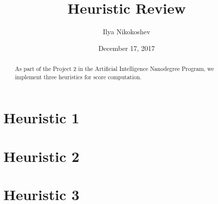 \documentclass[oneside]{article}   	%
\title{Heuristic Review}
\author{Ilya Nikokoshev}
\date{December 17, 2017}
\begin{document}
\maketitle

\begin{abstract}
As part of the Project 2 in the Artificial Intelligence Nanodegree Program, we implement three heuristics for score computation.
\end{abstract}


\section*{Heuristic 1}


\section*{Heuristic 2}


\section*{Heuristic 3}
\end{document}
